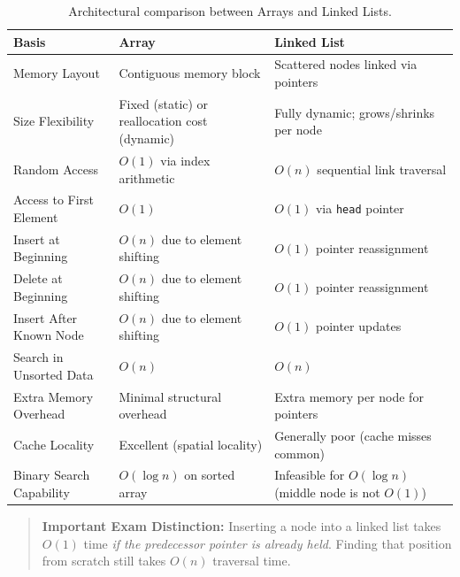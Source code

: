 \begin{table}[htbp]
\centering
\footnotesize
\begin{tabularx}{\textwidth}{l X X}
\toprule
\textbf{Basis} & \textbf{Array} & \textbf{Linked List} \\
\midrule
Memory Layout                   & Contiguous memory block                           & Scattered nodes linked via pointers \\
Size Flexibility                & Fixed (static) or reallocation cost (dynamic)      & Fully dynamic; grows/shrinks per node \\
Random Access                   & $O(1)$ via index arithmetic                       & $O(n)$ sequential link traversal \\
Access to First Element         & $O(1)$                                            & $O(1)$ via \texttt{head} pointer \\
Insert at Beginning             & $O(n)$ due to element shifting                    & $O(1)$ pointer reassignment \\
Delete at Beginning             & $O(n)$ due to element shifting                    & $O(1)$ pointer reassignment \\
Insert After Known Node         & $O(n)$ due to element shifting                    & $O(1)$ pointer updates \\
Search in Unsorted Data         & $O(n)$                                            & $O(n)$ \\
Extra Memory Overhead           & Minimal structural overhead                       & Extra memory per node for pointers \\
Cache Locality                  & Excellent (spatial locality)                      & Generally poor (cache misses common) \\
Binary Search Capability        & $O(\log n)$ on sorted array                       & Infeasible for $O(\log n)$ (middle node is not $O(1)$) \\
\bottomrule
\end{tabularx}
\caption{Architectural comparison between Arrays and Linked Lists.}
\end{table}

\begin{quote}
\textbf{Important Exam Distinction:} Inserting a node into a linked list takes $O(1)$ time \emph{if the predecessor pointer is already held}. Finding that position from scratch still takes $O(n)$ traversal time.
\end{quote}

